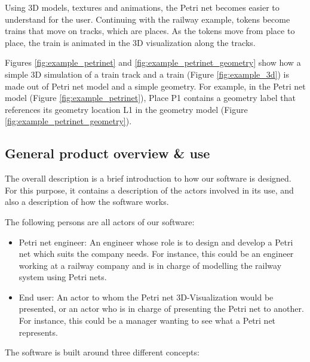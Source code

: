 Using 3D models, textures and animations, the Petri net becomes easier to understand for the user. Continuing with the railway example, tokens become trains that move on tracks, which are places. As the tokens move from place to place, the train is animated in the 3D visualization along the tracks.

Figures \ref{fig:example_petrinet} and \ref{fig:example_petrinet_geometry} show how a simple 3D simulation of a train track and a train (Figure \ref{fig:example_3d}) is made out of Petri net model and a simple geometry. For example, in the Petri net model (Figure \ref{fig:example_petrinet}), Place P1 contains a geometry label that references its geometry location L1 in the geometry model (Figure \ref{fig:example_petrinet_geometry}).

\newpage

\subsection{General product overview \& use}

The overall description is a brief introduction to how our software is designed. For this purpose, it contains a description of the actors involved in its use, and also a description of how the software works. \newline

The following persons are all actors of our software:

\begin{itemize}
  \item Petri net engineer: An engineer whose role is to design and develop a Petri net which suits the company needs. \newline
  For instance, this could be an engineer working at a railway company and is in charge of modelling the railway system using Petri nets.
  \item End user: An actor to whom the Petri net 3D-Visualization would be presented, or an actor who is in charge of presenting the Petri net to another. \newline
	For instance, this could be a manager wanting to see what a Petri net represents. 
\end{itemize}

The software is built around three different concepts: 

